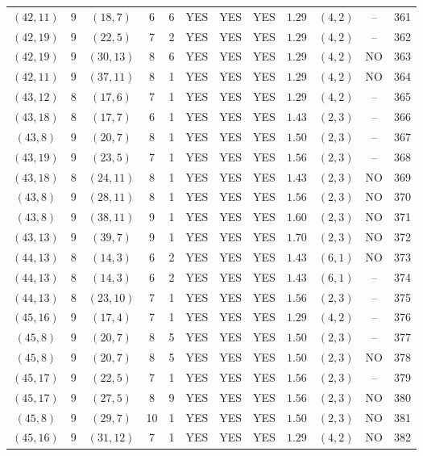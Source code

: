 \begin{longtable}{|c|c|c|c|c|c|c|c|c|c|c|c|}
$(42,11)$ & 9 & $(18,7)$ & 6 & 6 & YES & YES & YES & $1.29$ & $(4,2)$ & -- & 361\\
$(42,19)$ & 9 & $(22,5)$ & 7 & 2 & YES & YES & YES & $1.29$ & $(4,2)$ & -- & 362\\
$(42,19)$ & 9 & $(30,13)$ & 8 & 6 & YES & YES & YES & $1.29$ & $(4,2)$ & NO & 363\\
$(42,11)$ & 9 & $(37,11)$ & 8 & 1 & YES & YES & YES & $1.29$ & $(4,2)$ & NO & 364\\
$(43,12)$ & 8 & $(17,6)$ & 7 & 1 & YES & YES & YES & $1.29$ & $(4,2)$ & -- & 365\\
$(43,18)$ & 8 & $(17,7)$ & 6 & 1 & YES & YES & YES & $1.43$ & $(2,3)$ & -- & 366\\
$(43,8)$ & 9 & $(20,7)$ & 8 & 1 & YES & YES & YES & $1.50$ & $(2,3)$ & -- & 367\\
$(43,19)$ & 9 & $(23,5)$ & 7 & 1 & YES & YES & YES & $1.56$ & $(2,3)$ & -- & 368\\
$(43,18)$ & 8 & $(24,11)$ & 8 & 1 & YES & YES & YES & $1.43$ & $(2,3)$ & NO & 369\\
$(43,8)$ & 9 & $(28,11)$ & 8 & 1 & YES & YES & YES & $1.56$ & $(2,3)$ & NO & 370\\
$(43,8)$ & 9 & $(38,11)$ & 9 & 1 & YES & YES & YES & $1.60$ & $(2,3)$ & NO & 371\\
$(43,13)$ & 9 & $(39,7)$ & 9 & 1 & YES & YES & YES & $1.70$ & $(2,3)$ & NO & 372\\
$(44,13)$ & 8 & $(14,3)$ & 6 & 2 & YES & YES & YES & $1.43$ & $(6,1)$ & NO & 373\\
$(44,13)$ & 8 & $(14,3)$ & 6 & 2 & YES & YES & YES & $1.43$ & $(6,1)$ & -- & 374\\
$(44,13)$ & 8 & $(23,10)$ & 7 & 1 & YES & YES & YES & $1.56$ & $(2,3)$ & -- & 375\\
$(45,16)$ & 9 & $(17,4)$ & 7 & 1 & YES & YES & YES & $1.29$ & $(4,2)$ & -- & 376\\
$(45,8)$ & 9 & $(20,7)$ & 8 & 5 & YES & YES & YES & $1.50$ & $(2,3)$ & -- & 377\\
$(45,8)$ & 9 & $(20,7)$ & 8 & 5 & YES & YES & YES & $1.50$ & $(2,3)$ & NO & 378\\
$(45,17)$ & 9 & $(22,5)$ & 7 & 1 & YES & YES & YES & $1.56$ & $(2,3)$ & -- & 379\\
$(45,17)$ & 9 & $(27,5)$ & 8 & 9 & YES & YES & YES & $1.56$ & $(2,3)$ & NO & 380\\
$(45,8)$ & 9 & $(29,7)$ & 10 & 1 & YES & YES & YES & $1.50$ & $(2,3)$ & NO & 381\\
$(45,16)$ & 9 & $(31,12)$ & 7 & 1 & YES & YES & YES & $1.29$ & $(4,2)$ & NO & 382\\

\end{longtable}
